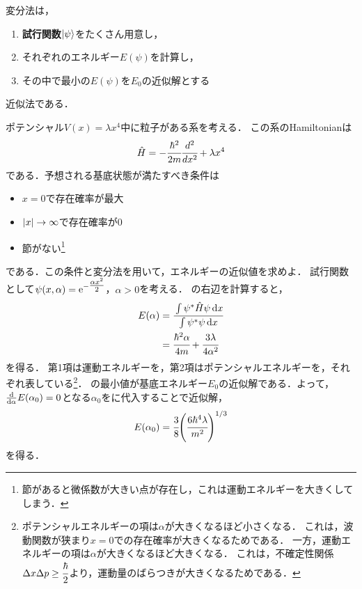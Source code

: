\documentclass{standalone}
\begin{document}
  変分法は，
  \begin{screen}
    \begin{enumerate}
      \item \textbf{試行関数}$\ket{\psi}$をたくさん用意し，
      \item それぞれのエネルギー$E(\psi)$を計算し，
      \item その中で最小の$E(\psi)$を$E_0$の近似解とする
    \end{enumerate}
  \end{screen}
  近似法である．
  \begin{myex}{}{}
    ポテンシャル$V(x)=\lambda x^4$中に粒子がある系を考える．
    この系のHamiltonianは
    \begin{align}
      \hat{H} = -\cfrac{\hbar^2}{2m}\cfrac{d^2}{dx^2} + \lambda x^4
    \end{align}
    である．予想される基底状態が満たすべき条件は
    \begin{itemize}
      \item $x = 0$で存在確率が最大
      \item $\abs{x} \to \infty$で存在確率が0
      \item 節がない\footnote{節があると微係数が大きい点が存在し，これは運動エネルギーを大きくしてしまう．}
    \end{itemize}
    である．この条件と変分法を用いて，エネルギーの近似値を求めよ．
    \tcblower
    試行関数として$\psi(x,\alpha) = \mathrm{e}^{-\tfrac{\alpha x^2}{2}}$，$\alpha > 0$を考える．
    の右辺を計算すると，
    \begin{align}
      E(\alpha) &= \cfrac{\int \psi^{*}\hat{H}\psi \dd{x}}{\int \psi^{*}\psi \dd{x}} \label{E1} \\ 
      &= \cfrac{\hbar^2 \alpha}{4m} + \cfrac{3\lambda}{4\alpha^2}
    \end{align}
    を得る．
    第1項は運動エネルギーを，第2項はポテンシャルエネルギーを，それぞれ表している\footnote{
      ポテンシャルエネルギーの項は$\alpha$が大きくなるほど小さくなる．
      これは，波動関数が狭まり$x=0$での存在確率が大きくなるためである．
      一方，運動エネルギーの項は$\alpha$が大きくなるほど大きくなる．
      これは，不確定性関係$\Delta x\Delta p \ge \cfrac{\hbar}{2}$より，運動量のばらつきが大きくなるためである．
    }．
    の最小値が基底エネルギー$E_0$の近似解である．よって，$\dv{\alpha}E(\alpha_0) = 0$となる$\alpha_0$をに代入することで近似解，
    \begin{align}
      E(\alpha_0) = \cfrac{3}{8}\qty(\cfrac{6\hbar^4\lambda}{m^2})^{1/3}
    \end{align}
    を得る．
  \end{myex}
\end{document}
